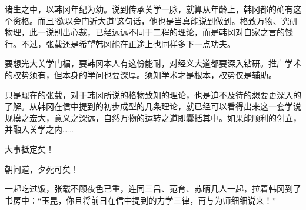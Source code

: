 诸生之中，以韩冈年纪为幼。说到传承关学一脉，就算从年龄上，韩冈都的确有这个资格。而且‘欲以旁门近大道’这句话，他也是当真能说到做到。格致万物、究研物理，此一说别出心裁，已经远远不同于二程的理论，而是韩冈对自家之言的饯行。不过，张载还是希望韩冈能在正途上也同样多下一点功夫。

要想光大关学门楣，要韩冈本人有这份能耐，对经义大道都要深入钻研。推广学术的权势须有，但本身的学问也要深厚。须知学术才是根本，权势仅是辅助。

只是现在的张载，对于韩冈所说的格物致知的理论，也是迫不及待的想要更深入的了解。从韩冈在信中提到的初步成型的几条理论，就已经可以看得出来这一套学说规模之宏大，意义之深远，自然万物的运转之道即囊括其中。如果能顺利的创立，并融入关学之内……

大事抵定矣！

朝问道，夕死可矣！

一起吃过饭，张载不顾夜色已重，连同三吕、范育、苏昞几人一起，拉着韩冈到了书房中：“玉昆，你且将前日在信中提到的力学三律，再与为师细细说来！”

